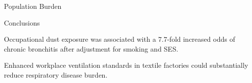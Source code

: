 \documentclass[palette=epi]{rossbeamerepi}
\begin{document}
\begin{frame}{Population Burden}
  \vskip12pt
\end{frame}

\begin{frame}{Conclusions}
  \begin{findingbox}
    Occupational dust exposure was associated with a 7.7-fold increased
    odds of chronic bronchitis after adjustment for smoking and SES.
  \end{findingbox}
  \vskip6pt
  \begin{implicationbox}
    Enhanced workplace ventilation standards in textile factories
    could substantially reduce respiratory disease burden.
  \end{implicationbox}
\end{frame}

\end{document}
